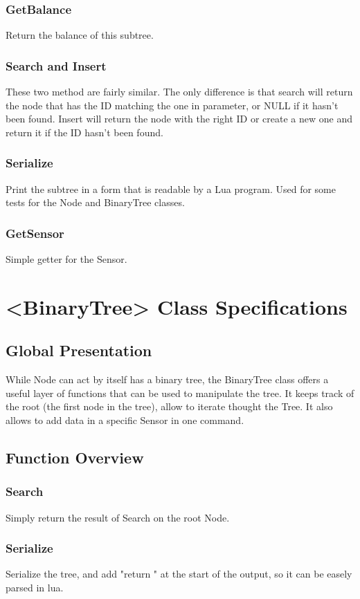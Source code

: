 \documentclass[10pt]{article}
\begin{document}
\subsubsection*{GetBalance}
Return the balance of this subtree.

\subsubsection*{Search and Insert}
These two method are fairly similar. The only difference is that search will return the node that has the ID matching the one in parameter, or NULL if it hasn't been found. Insert will return the node with the right ID or create a new one and return it if the ID hasn't been found.

\subsubsection*{Serialize}
Print the subtree in a form that is readable by a Lua program. Used for some tests for the Node and BinaryTree classes.

\subsubsection*{GetSensor}
Simple getter for the Sensor.

\section{<BinaryTree> Class Specifications}
\subsection{Global Presentation}
While Node can act by itself has a binary tree, the BinaryTree class offers a useful layer of functions that can be used to manipulate the tree. It keeps track of the root (the first node in the tree), allow to iterate thought the Tree. It also allows to add data in a specific Sensor in one command.

\subsection{Function Overview}
\subsubsection*{Search}
Simply return the result of Search on the root Node.

\subsubsection*{Serialize}
Serialize the tree, and add "return " at the start of the output, so it can be easely parsed in lua.
\end{document}
